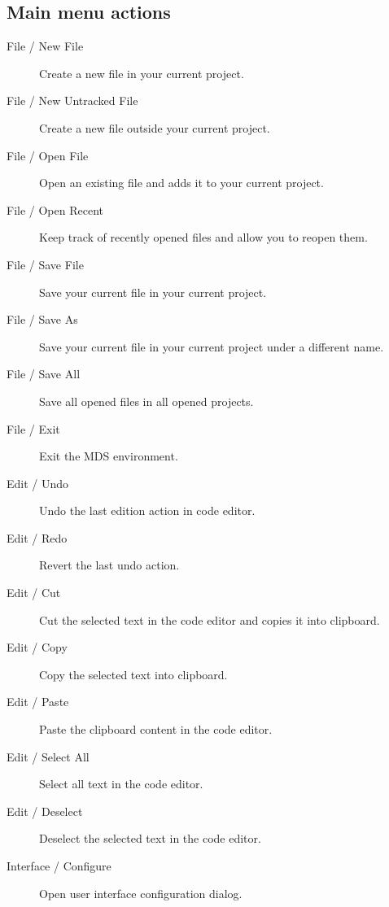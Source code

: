     \subsection{Main menu actions}
        \begin{description}
            \item[File / New File] Create a new file in your current project.
            \item[File / New Untracked File] Create a new file outside your current project.
            \item[File / Open File] Open an existing file and adds it to your current project.
            \item[File / Open Recent] Keep track of recently opened files and allow you to reopen them.
            \item[File / Save File] Save your current file in your current project.
            \item[File / Save As] Save your current file in your current project under a different name.
            \item[File / Save All] Save all opened files in all opened projects.
            \item[File / Exit] Exit the MDS environment.

            \item[Edit / Undo] Undo the last edition action in code editor.
            \item[Edit / Redo] Revert the last undo action.
            \item[Edit / Cut] Cut the selected text in the code editor and copies it into clipboard.
            \item[Edit / Copy] Copy the selected text into clipboard.
            \item[Edit / Paste] Paste the clipboard content in the code editor.
            \item[Edit / Select All] Select all text in the code editor.
            \item[Edit / Deselect] Deselect the selected text in the code editor.

            \item[Interface / Configure] Open user interface configuration dialog.


\end{description}
